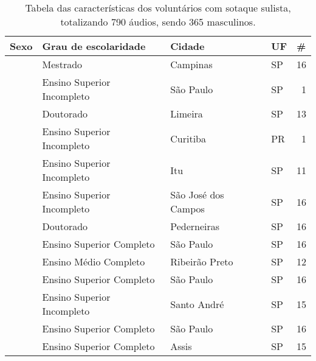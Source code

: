 \begin{table}[h]
\caption{Tabela das características dos voluntários com sotaque sulista, totalizando 790 áudios, sendo 365 masculinos.} \label{Tabela_sulista_fem}

\begin{tabular}{|l|l|l|l|r|}
\hline
Sexo                         & Grau de escolaridade           & Cidade              & UF & \multicolumn{1}{l|}{\#} \\ \hline
                             & Mestrado                       & Campinas            & SP & 16                      \\ \cline{2-5} 
                             & Ensino Superior Incompleto     & São Paulo           & SP & 1                       \\ \cline{2-5} 
                             & Doutorado                      & Limeira             & SP & 13                      \\ \cline{2-5} 
                             & Ensino Superior Incompleto     & Curitiba            & PR & 1                       \\ \cline{2-5} 
                             & Ensino Superior Incompleto     & Itu                 & SP & 11                      \\ \cline{2-5} 
                             & Ensino Superior Incompleto     & São José dos Campos & SP & 16                      \\ \cline{2-5} 
                             & Doutorado                      & Pederneiras         & SP & 16                      \\ \cline{2-5} 
                             & Ensino Superior Completo       & São Paulo           & SP & 16                      \\ \cline{2-5} 
                             & Ensino Médio Completo          & Ribeirão Preto      & SP & 12                      \\ \cline{2-5} 
                             & Ensino Superior Completo       & São Paulo           & SP & 16                      \\ \cline{2-5} 
                             & Ensino Superior Incompleto     & Santo André         & SP & 15                      \\ \cline{2-5} 
                             & Ensino Superior Completo       & São Paulo           & SP & 16                      \\ \cline{2-5} 
                             & Ensino Superior Completo       & Assis               & SP & 15                      \\ \cline{2-5} 

\end{tabular}
\end{table}
